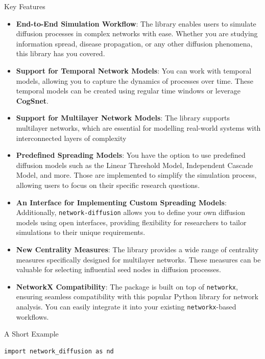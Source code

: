 \documentclass[final]{beamer}
\newlength{\colwidth}
\begin{document}
\begin{frame}[t, fragile]
\begin{columns}[t]
\begin{column}{\colwidth}
\begin{block}{Key Features}
    \begin{itemize}
        \item \textbf{End-to-End Simulation Workflow}: The library enables users 
        to simulate diffusion processes in complex networks with ease. Whether
        you are studying information spread, disease propagation, or any other
        diffusion phenomena, this library has you covered.
        \item \textbf{Support for Temporal Network Models}: You can work with temporal models, allowing you to
        capture the dynamics of processes over time. These temporal models can be
        created using regular time windows or leverage \textbf{CogSnet}.
        \item \textbf{Support for Multilayer Network Models}: The library supports multilayer networks, which are
        essential for modelling real-world systems with interconnected layers of
        complexity
        \item \textbf{Predefined Spreading Models}: You have the option to use predefined diffusion 
        models such as the Linear Threshold Model, Independent Cascade Model, and more. Those are
        implemented to simplify the simulation process, allowing users to focus on their specific
        research questions.
        \item \textbf{An Interface for Implementing Custom Spreading Models}: Additionally, 
        \lstinline[style=py]{network-diffusion} allows you to define your own diffusion models using
        open interfaces, providing flexibility for researchers to tailor simulations to their unique
        requirements.
        \item \textbf{New Centrality Measures}: The library provides a wide range of centrality 
        measures specifically designed for multilayer networks. These measures can be valuable for
        selecting influential seed nodes in diffusion processes.
        \item \textbf{NetworkX Compatibility}: The package is built on top of  
        \lstinline[style=py]{networkx}, ensuring seamless compatibility with this popular Python 
        library for network analysis. You can easily integrate it into your existing
        \lstinline[style=py]{networkx}-based workflows.
    \end{itemize}
\end{block}

\begin{alertblock}{A Short Example}
\begin{lstlisting}[style=py, basicstyle=\footnotesize\ttfamily]
import network_diffusion as nd


\end{lstlisting}
\end{alertblock}
\end{column}
\end{columns}
\end{frame}
\end{document}
